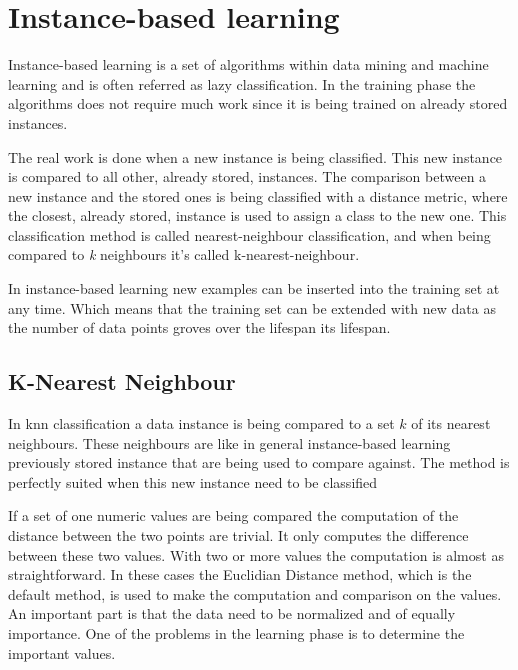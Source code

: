 \section{Instance-based learning}\label{sec:theoryInstanceLearning}
Instance-based learning is a set of algorithms within data mining and machine learning and is often referred as lazy classification.
In the training phase the algorithms does not require much work since it is being trained on already stored instances.
\cite[p. 78]{DataMiningPractical2011} 

\bigskip

The real work is done when a new instance is being classified.
This new instance is compared to all other, already stored, instances. 
The comparison between a new instance and the stored ones is being classified with a distance metric, where the closest, already stored, instance is used to assign a class to the new one.
This classification method is called nearest-neighbour classification, and when being compared to \textit{k} neighbours it's called k-nearest-neighbour.
\cite[p. 78]{DataMiningPractical2011} 

\bigskip

In instance-based learning new examples can be inserted into the training set at any time.
Which means that the training set can be extended with new data as the number of data points groves over the lifespan its lifespan.
\cite[p. 135]{DataMiningPractical2011} 


\subsection{K-Nearest Neighbour}\label{sec:theoryUnClassKnn}
In \acrfull{knn} classification a data instance is being compared to a set $k$ of its nearest neighbours.
These neighbours are like in general instance-based learning previously stored instance that are being used to compare against.
The method is perfectly suited when this new instance need to be classified \cite[p. 77-79]{DataMiningPractical2011}

\bigskip

If a set of one numeric values are being compared the computation of the distance between the two points are trivial. 
It only computes the difference between these two values.
With two or more values the computation is almost as straightforward.
In these cases the Euclidian Distance method, which is the default method, is used to make the computation and comparison on the values.
An important part is that the data need to be normalized and of equally importance.
One of the problems in the learning phase is to determine the important values.
\cite[p. 77-79]{DataMiningPractical2011}

